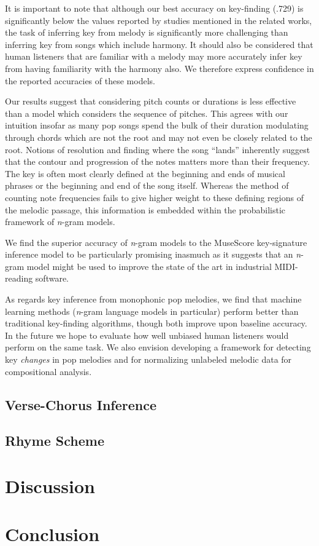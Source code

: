 \documentclass[letterpaper]{article}
\begin{document}
It is important to note that although our best accuracy on key-finding (.729) is significantly below the values reported by studies mentioned in the related works, the task of inferring key from melody is significantly more challenging than inferring key from songs which include harmony. It should also be considered that human listeners that are familiar with a melody may more accurately infer key from having familiarity with the harmony also. We therefore express confidence in the reported accuracies of these models.

Our results suggest that considering pitch counts or durations is less effective than a model which considers the sequence of pitches. This agrees with our intuition insofar as many pop songs spend the bulk of their duration modulating through chords which are not the root and may not even be closely related to the root. Notions of resolution and finding where the song ``lands'' inherently suggest that the contour and progression of the notes matters more than their frequency. The key is often most clearly defined at the beginning and ends of musical phrases or the beginning and end of the song itself. Whereas the method of counting note frequencies fails to give higher weight to these defining regions of the melodic passage, this information is embedded within the probabilistic framework of \emph{n}-gram models.

We find the superior accuracy of \emph{n}-gram models to the MuseScore key-signature inference model to be particularly promising inasmuch as it suggests that an \emph{n}-gram model might be used to improve the state of the art in industrial MIDI-reading software.

As regards key inference from monophonic pop melodies, we find that machine learning methods (\emph{n}-gram language models in particular) perform better than traditional key-finding algorithms, though both improve upon baseline accuracy. In the future we hope to evaluate how well unbiased human listeners would perform on the same task. We also envision developing a framework for detecting key \emph{changes} in pop melodies and for normalizing unlabeled melodic data for compositional analysis. 

\subsection{Verse-Chorus Inference}
\subsection{Rhyme Scheme}

\section{Discussion}

\section{Conclusion}



\end{document}
